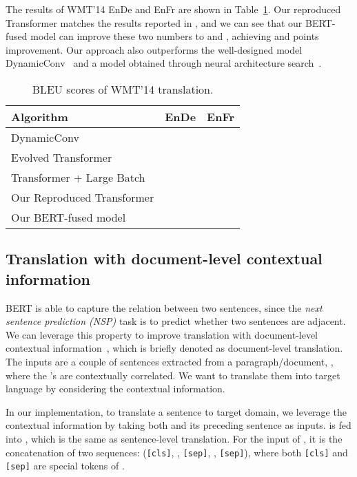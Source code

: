\documentclass{article} \usepackage{iclr2020_conference,times}
\begin{document}
The results of WMT'14 EnDe and EnFr are shown in Table~\ref{tab:results_wmt_en-de}. Our reproduced Transformer matches the results reported in \cite{ott2018scaling}, and we can see that our BERT-fused model can improve these two numbers to  and , achieving  and  points improvement. Our approach also outperforms the well-designed model DynamicConv~\citep{wu2019pay} and a model obtained through neural architecture search~\citep{so2019evolved}.

\begin{table}[!htbp]
\centering
\caption{BLEU scores of WMT'14 translation.}
\begin{tabular}{lcc}
\toprule
Algorithm & EnDe & EnFr \\
\midrule
DynamicConv~\citep{wu2019pay} &  &  \\
Evolved Transformer~\citep{so2019evolved} &  &  \\
\midrule
Transformer + Large Batch~\citep{ott2018scaling} &  &  \\
Our Reproduced  Transformer &  &  \\
Our BERT-fused model &  &  \\
\bottomrule
\end{tabular}
\label{tab:results_wmt_en-de}
\end{table}



\subsection{Translation with document-level contextual information}
BERT is able to capture the relation between two sentences, since the {\em next sentence prediction (NSP)} task is to predict whether two sentences are adjacent. We can leverage this property to improve translation with document-level contextual information~\citep{miculicich2018document}, which is briefly denoted as document-level translation. The inputs are a couple of sentences extracted from a paragraph/document, , where the  's are contextually correlated. We want to translate them into target language by considering the contextual information.

 In our implementation, to translate a sentence  to target domain, we leverage the contextual information by taking both  and its preceding sentence  as inputs.  is fed into , which is the same as sentence-level translation. For the input of , it is the concatenation of two sequences: (\texttt{[cls]}, , \texttt{[sep]}, , \texttt{[sep]}), where both \texttt{[cls]} and \texttt{[sep]} are special tokens of . 
\end{document}
